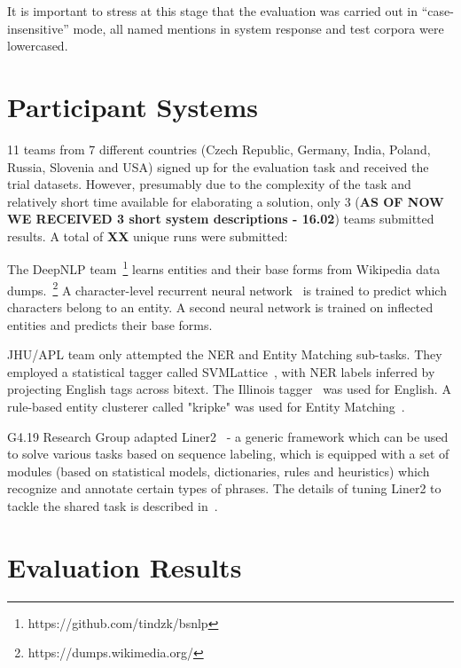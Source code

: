 \documentclass[11pt]{article}
\begin{document}
It is important to stress at this stage that the evaluation was carried out in ``case-insensitive'' 
mode, all named mentions in system response and test corpora were lowercased.

\section{Participant Systems}
\label{sec:participants}
 
11 teams from 7 different countries (Czech Republic, Germany, India, Poland, Russia, Slovenia and USA) signed up for the evaluation task and received the trial datasets. However, presumably due to the complexity of the task and relatively short
time available for elaborating a solution, only 3 (\textbf{AS OF NOW WE RECEIVED 3 short system descriptions - 16.02}) teams submitted results. A total of \textbf{XX} unique runs were submitted: 

The {\sc DeepNLP} team~\footnote{https://github.com/tindzk/bsnlp} learns entities and their base forms from 
Wikipedia data dumps.~\footnote{https://dumps.wikimedia.org/} A character-level recurrent neural network~\cite{DBLP:conf/aaai/KimJSR16} 
is trained to predict which characters belong to an entity. A second neural network is trained on inflected entities and predicts their base forms.


JHU/APL team only attempted the NER and Entity Matching sub-tasks. They employed a statistical tagger called 
SVMLattice~\cite{Mayfield:2003:LTU:956863.956921}, with NER labels inferred by projecting English tags across bitext. 
The Illinois tagger~\cite{Ratinov:2009:DCM:1596374.1596399} was used for English. A rule-based entity clusterer 
called "kripke" was used for Entity Matching~\cite{DBLP:conf/tac/McNameeMFL13}.

{\sc G4.19 Research Group} adapted Liner2~\cite{series/sci/MarcinczukKJ13} - a generic framework 
which can be used to solve various tasks based on sequence labeling, which is equipped
with a set of modules (based on statistical models, dictionaries, rules and heuristics) 
which recognize and annotate certain types of phrases. The details of tuning Liner2 to
tackle the shared task is described in~\cite{marcinczuk:2017}.

\section{Evaluation Results}
\label{sec:results}
\end{document}
